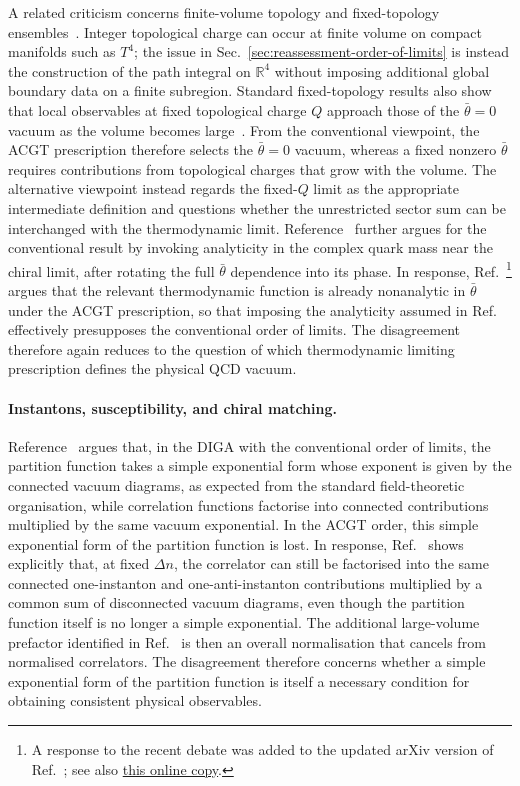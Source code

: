 \documentclass[review]{elsarticle}
\numberwithin{equation}{section}
\numberwithin{table}{section}
\numberwithin{figure}{section}
\begin{document}
A related criticism concerns finite-volume topology and fixed-topology ensembles~\cite{Bhattacharya:2025qsk,Ringwald:2026apz}. Integer topological charge can occur at finite volume on compact manifolds such as $T^4$; the issue in Sec.~\ref{sec:reassessment-order-of-limits} is instead the construction of the path integral on $\mathbb R^4$ without imposing additional global boundary data on a finite subregion. Standard fixed-topology results also show that local observables at fixed topological charge $Q$ approach those of the $\bar\theta=0$ vacuum as the volume becomes large~\cite{Brower:2003yx,Aoki:2007ka}. From the conventional viewpoint, the ACGT prescription therefore selects the $\bar\theta=0$ vacuum, whereas a fixed nonzero $\bar\theta$ requires contributions from topological charges that grow with the volume. The alternative viewpoint instead regards the fixed-$Q$ limit as the appropriate intermediate definition and questions whether the unrestricted sector sum can be interchanged with the thermodynamic limit. Reference~\cite{Ringwald:2026apz} further argues for the conventional result by invoking analyticity in the complex quark mass near the chiral limit, after rotating the full $\bar\theta$ dependence into its phase. In response, Ref.~\cite{Ai:2024cnp}\footnote{A response to the recent debate was added to the updated arXiv version of Ref.~\cite{Ai:2024cnp}; see also \href{http://users.ph.nat.tum.de/t70/CPconservation/reply_to_recent.pdf}{this online copy}.} argues that the relevant thermodynamic function is already nonanalytic in $\bar\theta$ under the ACGT prescription, so that imposing the analyticity assumed in Ref.~\cite{Ringwald:2026apz} effectively presupposes the conventional order of limits. The disagreement therefore again reduces to the question of which thermodynamic limiting prescription defines the physical QCD vacuum.

\paragraph{Instantons, susceptibility, and chiral matching.}

Reference~\cite{Khoze:2025auv} argues that, in the DIGA with the conventional order of limits, the partition function takes a simple exponential form whose exponent is given by the connected vacuum diagrams, as expected from the standard field-theoretic organisation, while correlation functions factorise into connected contributions multiplied by the same vacuum exponential. In the ACGT order, this simple exponential form of the partition function is lost. In response, Ref.~\cite{Ai:2024cnp} shows explicitly that, at fixed $\Delta n$, the correlator can still be factorised into the same connected one-instanton and one-anti-instanton contributions multiplied by a common sum of disconnected vacuum diagrams, even though the partition function itself is no longer a simple exponential. The additional large-volume prefactor identified in Ref.~\cite{Khoze:2025auv} is then an overall normalisation that cancels from normalised correlators. The disagreement therefore concerns whether a simple exponential form of the partition function is itself a necessary condition for obtaining consistent physical observables.
\end{document}
